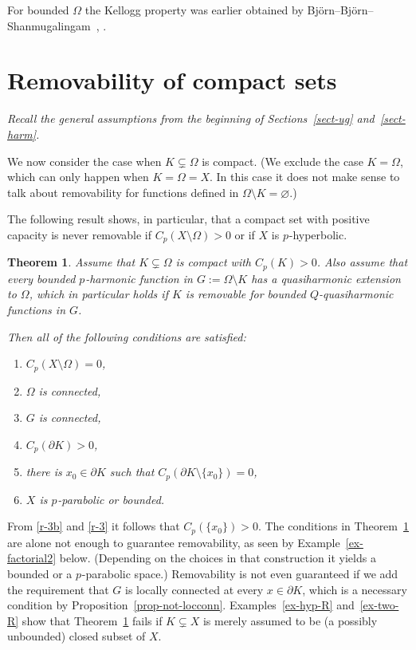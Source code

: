 \documentclass[a4paper,twoside]{article}
\theoremstyle{propositional}
\newtheorem{thm}{Theorem}[section]
\theoremstyle{descriptive}
\theoremstyle{remarkstyle}
\newcommand{\setm}{\setminus}
\renewcommand{\subsetneq}{\varsubsetneq}
\renewcommand{\emptyset}{\varnothing}
\newcommand{\Cp}{{C_p}}
\newcommand{\bdry}{\partial}
\newcommand{\bdy}{\bdry}
\newcommand{\Om}{\Omega}
\newcommand{\p}{{$p\mspace{1mu}$}}
\numberwithin{equation}{section}
\begin{document}
For bounded $\Om$ the Kellogg property was earlier obtained by 
Bj\"orn--Bj\"orn--Shan\-mu\-ga\-lin\-gam~\cite[Theorem~3.9]{BBS}, 
\cite[Theorem~6.1]{BBS2}.





\section{Removability of compact sets} 
\label{sect-cpt}

\emph{Recall the general assumptions from the beginning of Sections~\ref{sect-ug}
and~\ref{sect-harm}.}

\medskip

We now consider the case when $K\subsetneq \Om$ is compact.
(We exclude the case $K=\Om$, which can only happen when $K=\Om=X$.
In this case it does not make   
 sense to talk about removability for functions defined in
$\Om \setm K=\emptyset$.)

The following result shows, in particular,
that a compact set with positive
capacity is never removable if $\Cp(X \setm \Om)>0$
or if $X$ is \p-hyperbolic.


\begin{thm} \label{thm-cpt-pharm-nec}
Assume that $K\subsetneq\Om$ is compact with $\Cp(K)>0$.
Also assume that every bounded 
\p-harmonic function in $G:=\Om \setm K$
has a quasiharmonic extension to $\Om$,
which in particular holds if 
$K$ is removable for bounded $Q$-quasiharmonic functions in $G$.


Then all of the following conditions are satisfied\/\textup:
\begin{enumerate}
\item \label{r-1}
$\Cp(X \setm \Om)=0$,
\item \label{r-a}
$\Om$ is connected,
\item \label{r-2}
$G$ is connected, 
\item \label{r-3b}
$\Cp(\bdy K)>0$,
\item \label{r-3}
 there is
$x_0 \in \bdy K$ such that $\Cp(\bdy K \setm \{x_0\})=0$,
\item \label{r-5}
$X$ is \p-parabolic or bounded.
\end{enumerate}
\end{thm}

From \ref{r-3b} and \ref{r-3} it follows that $\Cp(\{x_0\})>0$.
The conditions in 
Theorem~\ref{thm-cpt-pharm-nec} are alone not enough to guarantee
removability, as seen by 
Example~\ref{ex-factorial2} below.
(Depending on the choices in that construction
it yields a bounded or a \p-parabolic space.)
Removability is not even guaranteed
if we add the  requirement that 
$G$ is locally connected at every $x\in \bdy K$,
which is a necessary condition
by Proposition~\ref{prop-not-locconn}.
Examples~\ref{ex-hyp-R} and~\ref{ex-two-R} show that 
Theorem~\ref{thm-cpt-pharm-nec} fails if $K \subsetneq X$ is merely
assumed to be (a possibly unbounded) closed subset of $X$.
\end{document}
